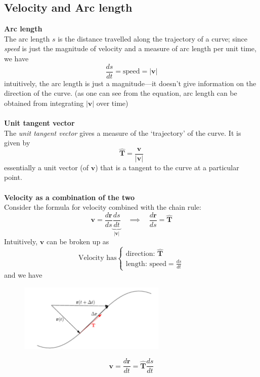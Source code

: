 \documentclass{report}
\begin{document}
\subsection{Velocity and Arc length} %
\textbf{Arc length}\\
The arc length $s$ is the distance travelled along the trajectory of a curve; since \textit{speed} is 
just the magnitude of velocity and a measure of arc length per unit time, we have
\begin{equation*}
\frac{ds}{dt}=\text{speed}=|\bm{v}|
\end{equation*}
intuitively, the arc length is just a magnitude---it doesn't give information on the direction of the curve.
(as one can see from the equation, arc length can be obtained from integrating $|\bm{v}|$ over time)\\
\vspace{1mm}\\
\textbf{Unit tangent vector}\\
The \textit{unit tangent vector} gives a measure of the `trajectory' of the curve. It is given by
\begin{equation*}
\hat{\bm{T}}=\frac{\bm{v}}{|\bm{v}|}
\end{equation*}
essentially a unit vector (of $\bm{v}$) that is a tangent to the curve at a particular point.\\
\vspace{1mm}\\
\textbf{Velocity as a combination of the two}\\
Consider the formula for velocity combined with the chain rule:
\begin{equation*}
\bm{v}=\frac{d\bm{r}}{ds}\underbrace{\frac{ds}{dt}}_{|\bm{v}|}\quad\implies\quad\frac{d\bm{r}}{ds}=\hat{\bm{T}}
\end{equation*}
Intuitively, $\bm{v}$ can be broken up as
\begin{equation*}
\text{Velocity has}\begin{cases}
\text{direction}:\,\hat{\bm{T}}\\
\text{length}:\,\text{speed}=\frac{ds}{dt}
\end{cases}
\end{equation*}
and we have 
\begin{figure}[h]
\begin{center}
\includegraphics[width=7cm]{92}\\
\end{center}
\begin{equation*}
\bm{v}=\frac{d\bm{r}}{dt}=\hat{\bm{T}}\frac{ds}{dt}
\end{equation*}
\end{figure}
\newpage
\end{document}
